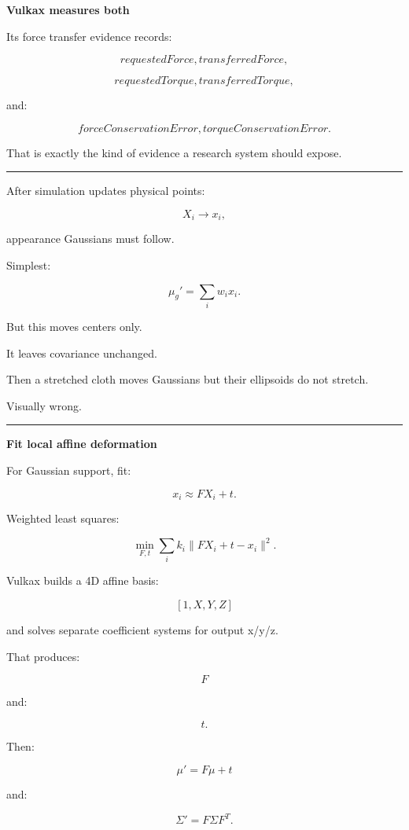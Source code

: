 \textbf{Vulkax measures both}

Its force transfer evidence records:

\[
requestedForce,
transferredForce,
\]

\[
requestedTorque,
transferredTorque,
\]

and:

\[
forceConservationError,
torqueConservationError.
\]

That is exactly the kind of evidence a research system should expose.

\begin{center}\rule{0.5\linewidth}{0.5pt}\end{center}

After simulation updates physical points:

\[
X_i\rightarrow x_i,
\]

appearance Gaussians must follow.

Simplest:

\[
\mu_g'
=
\sum_iw_ix_i.
\]

But this moves centers only.

It leaves covariance unchanged.

Then a stretched cloth moves Gaussians but their ellipsoids do not stretch.

Visually wrong.

\begin{center}\rule{0.5\linewidth}{0.5pt}\end{center}

\textbf{Fit local affine deformation}

For Gaussian support, fit:

\[
x_i
\approx
F X_i+t.
\]

Weighted least squares:

\[
\min_{F,t}
\sum_i
k_i
\|
FX_i+t-x_i
\|^2.
\]

Vulkax builds a 4D affine basis:

\[
[1,X,Y,Z]
\]

and solves separate coefficient systems for output x/y/z.

That produces:

\[
F
\]

and:

\[
t.
\]

Then:

\[
\mu'=
F\mu+t
\]

and:

\[
\Sigma'
=
F\Sigma F^T.
\]

